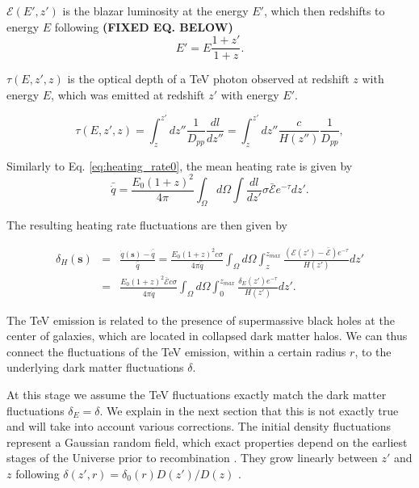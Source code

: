 \documentclass[twocolumns]{emulateapj}
\newcommand\Ec[1]{{\color{magenta} \bf #1}} %
\begin{document}
$\mathcal{E}(E',z')$ is  the   blazar luminosity at the energy $E'$,  which then redshifts to energy $E$ following \Ec{(FIXED EQ. BELOW)}
\begin{equation}
  \label{eq:E_z}
  E'=E\frac{1+z'}{1+z}.
\end{equation}

$\tau(E,z',z)$ is the optical depth of a TeV photon observed at redshift $z$ with energy $E$, which was emitted at redshift $z'$ with energy $E'$.

\begin{equation}
  \label{eq:tau}
  \tau(E,z',z)=\int_z^{z'}dz''\frac{1}{D_{pp}}\frac{dl}{dz''}=\int_z^{z'}dz''\frac{c}{H(z'')}\frac{1}{D_{pp}},
\end{equation}



Similarly to Eq. \ref{eq:heating_rate0},  the mean heating rate is given by 
\begin{equation}
  \label{eq:mean_exp_heat}
  \bar{\dot{q}}=\frac{E_0(1+z)^2}{4\pi}\int_{\Omega}d\Omega\int \frac{dl}{dz'}\sigma\bar{\mathcal{E}} e^{-\tau}dz'.
\end{equation}


The resulting heating rate fluctuations are then given by

\begin{eqnarray}
  \label{eq:fluc_exp0}
  \delta_H(\mathbf{s})&=&\frac{\dot{q}(\mathbf{s})-\bar{\dot{q}}}{\bar{\dot{q}}}=\frac{E_0(1+z)^2c\sigma}{4\pi\bar{\dot{q}}} \int_{\Omega}d\Omega\int_z^{z_{max}} \frac{ ( \mathcal{E}(z')-\bar{\mathcal{E}})  e^{-\tau}}{H(z')} dz' \\ \nonumber
  &=&\frac{E_0(1+z)^2\bar{\mathcal{E}} c\sigma}{4\pi\bar{\dot{q}}}  \int_{\Omega}d\Omega\int_0^{z_{max}}   \frac{\delta_E(z')  e^{-\tau}}{H(z')}dz'.
\end{eqnarray}

The TeV emission is related to the presence of supermassive black holes at the center of galaxies, which are located in collapsed dark matter halos.  We can thus connect the fluctuations of the TeV emission, within a certain radius $r$, to the underlying dark matter fluctuations $\delta$.

At this stage we assume the TeV fluctuations exactly match the dark matter fluctuations $\delta_E=\delta$.  We explain in the next section that this is not exactly true and will take into account various corrections.  The initial density fluctuations represent a Gaussian random field, which exact properties depend on the earliest stages of the Universe prior to recombination \citep{1986ApJ...304...15B,Peebles}. They grow linearly between $z'$ and $z$ following $\delta(z',r)=\delta_0(r)D(z')/D(z)$ \citep{ 1977MNRAS.179..351H}.
\end{document}
